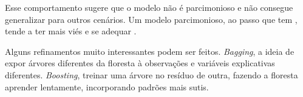 Esse comportamento sugere que o modelo não é parcimonioso e não consegue generalizar para outros cenários. Um modelo parcimonioso, ao passo que tem , tende a ter mais viés e se adequar . 



  
  
 
  

 
 
Alguns refinamentos muito interessantes podem ser feitos. \textit{Bagging}, a ideia de expor árvores diferentes da floresta à observações e variáveis explicativas diferentes. \textit{Boosting}, treinar uma árvore no resíduo de outra, fazendo a floresta aprender lentamente, incorporando padrões mais sutis. 
 
 
 
